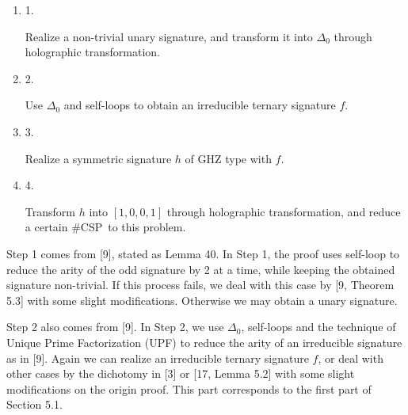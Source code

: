 \documentclass[10pt,a4paper]{article}
\begin{document}
\begin{enumerate}


\item[] 
1. 


Realize a non-trivial unary signature, and transform it into $\Delta_{0}$ through holographic transformation.\par





\item[] 
2. 


Use $\Delta_{0}$ and self-loops to obtain an irreducible ternary signature $f$.\par





\item[] 
3. 


Realize a symmetric signature $h$ of GHZ type with $f$.\par





\item[] 
4. 


Transform $h$ into $[1,0,0,1]$ through holographic transformation, and reduce a certain \#CSP to this problem.\par





\end{enumerate}




Step 1 comes from [9], stated as Lemma 40. In Step 1, the proof uses self-loop to reduce the arity of the odd signature by 2 at a time, while keeping the obtained signature non-trivial. If this process fails, we deal with this case by [9, Theorem 5.3] with some slight modifications. Otherwise we may obtain a unary signature.\par




Step 2 also comes from [9]. In Step 2, we use $\Delta_{0}$, self-loops and the technique of Unique Prime Factorization (UPF) to reduce the arity of an irreducible signature as in [9]. Again we can realize an irreducible ternary signature $f$, or deal with other cases by the dichotomy in [3] or [17, Lemma 5.2] with some slight modifications on the origin proof. This part corresponds to the first part of Section 5.1.\par
\end{document}
